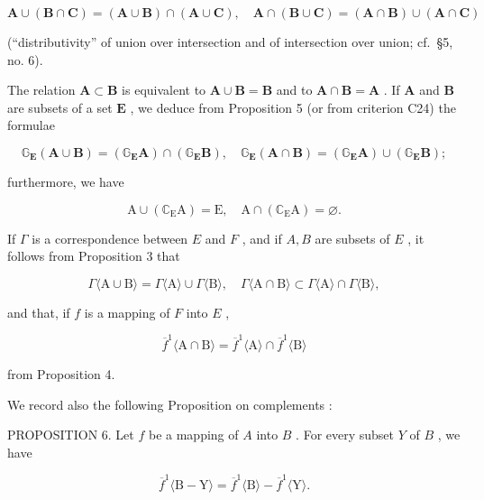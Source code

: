 \[
\mathbf {A} \cup (\mathbf {B} \cap \mathbf {C}) = (\mathbf {A} \cup \mathbf {B}) \cap (\mathbf {A} \cup \mathbf {C}), \quad \mathbf {A} \cap (\mathbf {B} \cup \mathbf {C}) = (\mathbf {A} \cap \mathbf {B}) \cup (\mathbf {A} \cap \mathbf {C})
\]

(``distributivity'' of union over intersection and of intersection over union; cf.~§5, no. 6).

The relation \(\mathbf{A} \subset \mathbf{B}\) is equivalent to \(\mathbf{A} \cup \mathbf{B} = \mathbf{B}\) and to \(\mathbf{A} \cap \mathbf{B} = \mathbf{A}\) . If \(\mathbf{A}\) and \(\mathbf{B}\) are subsets of a set \(\mathbf{E}\) , we deduce from Proposition 5 (or from criterion C24) the formulae

\[
\mathbb {G} _ {\mathbf {E}} (\mathbf {A} \cup \mathbf {B}) = \left(\mathbb {G} _ {\mathbf {E}} \mathbf {A}\right) \cap \left(\mathbb {G} _ {\mathbf {E}} \mathbf {B}\right), \quad \mathbb {G} _ {\mathbf {E}} (\mathbf {A} \cap \mathbf {B}) = \left(\mathbb {G} _ {\mathbf {E}} \mathbf {A}\right) \cup \left(\mathbb {G} _ {\mathbf {E}} \mathbf {B}\right);
\]

furthermore, we have

\[
\mathrm{A} \cup (\mathbb {C} _ {\mathrm{E}} \mathrm{A}) = \mathrm{E}, \quad \mathrm{A} \cap (\mathbb {C} _ {\mathrm{E}} \mathrm{A}) = \varnothing .
\]

If \(\Gamma\) is a correspondence between \(E\) and \(F\) , and if \(A, B\) are subsets of \(E\) , it follows from Proposition 3 that

\[
\Gamma \langle \mathrm{A} \cup \mathrm{B} \rangle = \Gamma \langle \mathrm{A} \rangle \cup \Gamma \langle \mathrm{B} \rangle , \quad \Gamma \langle \mathrm{A} \cap \mathrm{B} \rangle \subset \Gamma \langle \mathrm{A} \rangle \cap \Gamma \langle \mathrm{B} \rangle ,
\]

and that, if \(f\) is a mapping of \(F\) into \(E\) ,

\[
\overline {{{f}}} ^ {1} \langle \mathrm{A} \cap \mathrm{B} \rangle = \overline {{{f}}} ^ {1} \langle \mathrm{A} \rangle \cap \overline {{{f}}} ^ {1} \langle \mathrm{B} \rangle
\]

from Proposition 4.

We record also the following Proposition on complements :

PROPOSITION 6. Let \(f\) be a mapping of \(A\) into \(B\) . For every subset \(Y\) of \(B\) , we have

\[
\overline {{{f}}} ^ {1} \langle \mathrm{B} - \mathrm{Y} \rangle = \overline {{{f}}} ^ {1} \langle \mathrm{B} \rangle - \overline {{{f}}} ^ {1} \langle \mathrm{Y} \rangle .
\]

